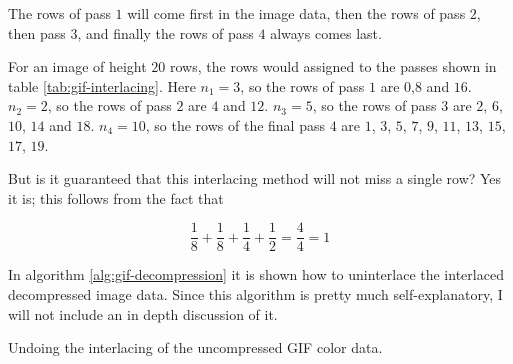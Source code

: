 The rows of pass $1$ will come first in the image data, then the rows
of pass $2$, then pass $3$, and finally the rows of pass $4$ always
comes last.

For an image of height $20$ rows, the rows would assigned to the
passes shown in table \ref{tab:gif-interlacing}. Here $n_1 =
3$, so the rows of pass $1$ are $0$,$8$ and $16$. $n_2 = 2$, so the
rows of pass $2$ are $4$ and $12$. $n_3 = 5$, so the rows of pass $3$
are $2$, $6$, $10$, $14$ and $18$. $n_4 = 10$, so the rows of the
final pass $4$ are $1$, $3$, $5$, $7$, $9$, $11$, $13$, $15$, $17$,
$19$.

But is it guaranteed that this interlacing method will not miss a single
row? Yes it is; this follows from the fact that

\begin{equation*}
  \frac{1}{8} + \frac{1}{8} + \frac{1}{4} + \frac{1}{2} = \frac{4}{4}
  = 1
\end{equation*}

In algorithm \ref{alg:gif-decompression} it is shown how to
uninterlace the interlaced decompressed image data. Since this
algorithm is pretty much self-explanatory, I will not include an in
depth discussion of it.

\begin{algorithm}[H]
  \caption{Undoing the interlacing of the uncompressed GIF color data.}
  \label{alg:gif-interlace}
  \begin{algorithmic}[1]






        \EndForTo


      \EndWhile

    \EndForTo

  \end{algorithmic}
\end{algorithm}

